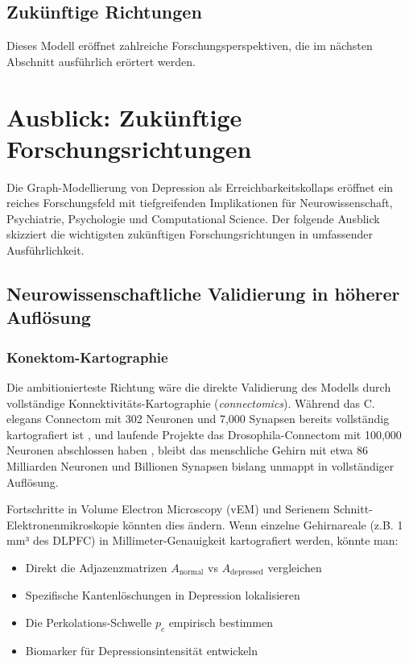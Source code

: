 \documentclass[a4paper,12pt]{article}
\theoremstyle{definition}
\begin{document}
\subsection{Zukünftige Richtungen}

Dieses Modell eröffnet zahlreiche Forschungsperspektiven, die im nächsten Abschnitt ausführlich erörtert werden.

\section{Ausblick: Zukünftige Forschungsrichtungen}

Die Graph-Modellierung von Depression als Erreichbarkeitskollaps eröffnet ein reiches Forschungsfeld mit tiefgreifenden Implikationen für Neurowissenschaft, Psychiatrie, Psychologie und Computational Science. Der folgende Ausblick skizziert die wichtigsten zukünftigen Forschungsrichtungen in umfassender Ausführlichkeit.

\subsection{Neurowissenschaftliche Validierung in höherer Auflösung}

\subsubsection{Konektom-Kartographie}

Die ambitionierteste Richtung wäre die direkte Validierung des Modells durch vollständige Konnektivitäts-Kartographie (\textit{connectomics}). Während das C. elegans Connectom mit 302 Neuronen und 7,000 Synapsen bereits vollständig kartografiert ist \cite{white1986}, und laufende Projekte das Drosophila-Connectom mit 100,000 Neuronen abschlossen haben \cite{eichler2020}, bleibt das menschliche Gehirn mit etwa 86 Milliarden Neuronen und Billionen Synapsen bislang unmappt in vollständiger Auflösung.

Fortschritte in Volume Electron Microscopy (vEM) und Serienem Schnitt-Elektronenmikroskopie könnten dies ändern. Wenn einzelne Gehirnareale (z.B. 1 mm³ des DLPFC) in Millimeter-Genauigkeit kartografiert werden, könnte man:

\begin{itemize}
	\item Direkt die Adjazenzmatrizen $A_{\text{normal}}$ vs $A_{\text{depressed}}$ vergleichen
	\item Spezifische Kantenlöschungen in Depression lokalisieren
	\item Die Perkolations-Schwelle $p_c$ empirisch bestimmen
	\item Biomarker für Depressionsintensität entwickeln
\end{itemize}
\end{document}
